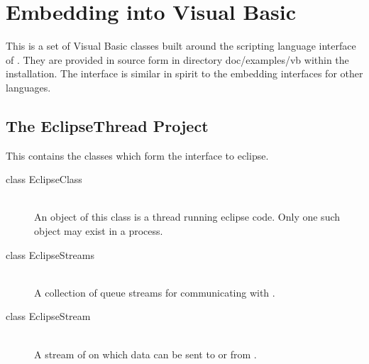 %
% 
% 
% 
% 
%
%

\chapter{Embedding into Visual Basic}
\label{chapvb}

This is a set of Visual Basic classes built around the scripting
language interface of {\eclipse}. They are provided in source form
in directory doc/examples/vb within the installation.
The interface is similar in spirit to the {\eclipse} embedding
interfaces for other languages.


\section{The EclipseThread Project}
This contains the classes which form the interface to eclipse.
\begin{description}
\item[class		EclipseClass]\ \\
	An object of this class is a thread running eclipse code. Only
	one such object may exist in a process.

\item[class		EclipseStreams]\ \\
	A collection of queue streams for communicating with {\eclipse}.

\item[class		EclipseStream]\ \\
	A stream of on which data can be sent to or from {\eclipse}.

\end{description}

